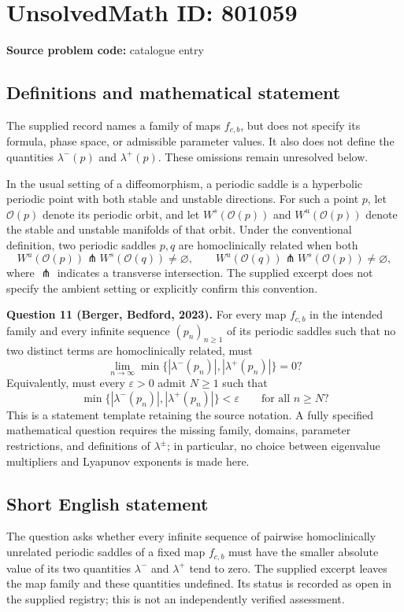 \documentclass[11pt]{article}
\begin{document}
\section*{UnsolvedMath ID: 801059}
\textbf{Source problem code:} catalogue entry
\subsection{Definitions and mathematical statement}
The supplied record names a family of maps \(f_{c,b}\), but does not specify its formula, phase space, or admissible parameter values. It also does not define the quantities \(\lambda^-(p)\) and \(\lambda^+(p)\). These omissions remain unresolved below.

In the usual setting of a diffeomorphism, a periodic saddle is a hyperbolic periodic point with both stable and unstable directions. For such a point \(p\), let \(\mathcal O(p)\) denote its periodic orbit, and let \(W^s(\mathcal O(p))\) and \(W^u(\mathcal O(p))\) denote the stable and unstable manifolds of that orbit. Under the conventional definition, two periodic saddles \(p,q\) are homoclinically related when both
\[
W^u(\mathcal O(p))\pitchfork W^s(\mathcal O(q))\ne\varnothing,
\qquad
W^u(\mathcal O(q))\pitchfork W^s(\mathcal O(p))\ne\varnothing,
\]
where \(\pitchfork\) indicates a transverse intersection. The supplied excerpt does not specify the ambient setting or explicitly confirm this convention.

\textbf{Question 11 (Berger, Bedford, 2023).} For every map \(f_{c,b}\) in the intended family and every infinite sequence \((p_n)_{n\ge1}\) of its periodic saddles such that no two distinct terms are homoclinically related, must
\[
\lim_{n\to\infty}\min\bigl\{|\lambda^-(p_n)|,|\lambda^+(p_n)|\bigr\}=0?
\]
Equivalently, must every \(\varepsilon>0\) admit \(N\ge1\) such that
\[
\min\bigl\{|\lambda^-(p_n)|,|\lambda^+(p_n)|\bigr\}<\varepsilon
\qquad\text{for all }n\ge N?
\]
This is a statement template retaining the source notation. A fully specified mathematical question requires the missing family, domains, parameter restrictions, and definitions of \(\lambda^\pm\); in particular, no choice between eigenvalue multipliers and Lyapunov exponents is made here.
\subsection{Short English statement}
The question asks whether every infinite sequence of pairwise homoclinically unrelated periodic saddles of a fixed map \(f_{c,b}\) must have the smaller absolute value of its two quantities \(\lambda^-\) and \(\lambda^+\) tend to zero. The supplied excerpt leaves the map family and these quantities undefined. Its status is recorded as open in the supplied registry; this is not an independently verified assessment.
\end{document}
